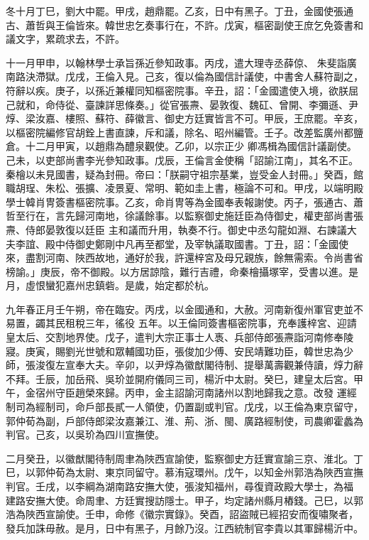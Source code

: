 \begin{pinyinscope}
 冬十月丁巳，劉大中罷。甲戌，趙鼎罷。乙亥，日中有黑子。丁丑，金國使張通古、蕭哲與王倫皆來。韓世忠乞奏事行在，不許。戊寅，樞密副使王庶乞免簽書和議文字，累疏求去，不許。



 十一月甲申，以翰林學士承旨孫近參知政事。丙戌，遣大理寺丞薛倞、
 朱斐詣廣南路決滯獄。戊戌，王倫入見。己亥，復以倫為國信計議使，中書舍人蘇符副之，符辭以疾。庚子，以孫近兼權同知樞密院事。辛丑，詔：「金國遣使入境，欲朕屈己就和，命侍從、臺諫詳思條奏。」從官張燾、晏敦復、魏矼、曾開、李彌遜、尹焞、梁汝嘉、樓照、蘇符、薛徽言、御史方廷實皆言不可。甲辰，王庶罷。辛亥，以樞密院編修官胡銓上書直諫，斥和議，除名、昭州編管。壬子。改差監廣州都鹽倉。十二月甲寅，以趙鼎為醴泉觀使。乙卯，以宗正少
 卿馮楫為國信計議副使。己未，以吏部尚書李光參知政事。戊辰，王倫言金使稱「詔諭江南」，其名不正。秦檜以未見國書，疑為封冊。帝曰：「朕嗣守祖宗基業，豈受金人封冊。」癸酉，館職胡珵、朱松、張擴、凌景夏、常明、範如圭上書，極論不可和。甲戌，以端明殿學士韓肖冑簽書樞密院事。乙亥，命肖冑等為金國奉表報謝使。丙子，張通古、蕭哲至行在，言先歸河南地，徐議餘事。以監察御史施廷臣為侍御史，權吏部尚書張燾、侍郎晏敦復以廷臣
 主和議而升用，執奏不行。御史中丞勾龍如淵、右諫議大夫李誼、殿中侍御史鄭剛中凡再至都堂，及宰執議取國書。丁丑，詔：「金國使來，盡割河南、陜西故地，通好於我，許還梓宮及母兄親族，餘無需索。令尚書省榜諭。」庚辰，帝不御殿。以方居諒陰，難行吉禮，命秦檜攝塚宰，受書以進。是月，虛恨蠻犯嘉州忠鎮砦。是歲，始定都於杭。



 九年春正月壬午朔，帝在臨安。丙戌，以金國通和，大赦。河南新復州軍官吏並不易置，蠲其民租稅三年，徭役
 五年。以王倫同簽書樞密院事，充奉護梓宮、迎請皇太后、交割地界使。戊子，遣判大宗正事士人褭、兵部侍郎張燾詣河南修奉陵寢。庚寅，賜劉光世號和眾輔國功臣，張俊加少傅、安民靖難功臣，韓世忠為少師，張浚復左宣奉大夫。辛卯，以尹焞為徽猷閣待制、提舉萬壽觀兼侍讀，焞力辭不拜。壬辰，加岳飛、吳玠並開府儀同三司，楊沂中太尉。癸巳，建皇太后宮。甲午，金宿州守臣趙榮來歸。丙申，金主詔諭河南諸州以割地歸我之意。改發
 運經制司為經制司，命戶部長貳一人領使，仍置副或判官。戊戌，以王倫為東京留守，郭仲荀為副，戶部侍郎梁汝嘉兼江、淮、荊、浙、閩、廣路經制使，司農卿霍蠡為判官。己亥，以吳玠為四川宣撫使。



 二月癸丑，以徽猷閣待制周聿為陜西宣諭使，監察御史方廷實宣諭三京、淮北。丁巳，以郭仲荀為太尉、東京同留守。慕洧寇環州。戊午，以知金州郭浩為陜西宣撫判官。壬戌，以李綱為湖南路安撫大使，張浚知福州，尋復資政殿大學士，為福
 建路安撫大使。命周聿、方廷實搜訪隱士。甲子，均定諸州縣月樁錢。己巳，以郭浩為陜西宣諭使。壬申，命修《徽宗實錄》。癸酉，詔盜賊已經招安而復嘯聚者，發兵加誅毋赦。是月，日中有黑子，月餘乃沒。江西統制官李貴以其軍歸楊沂中。




\end{pinyinscope}
